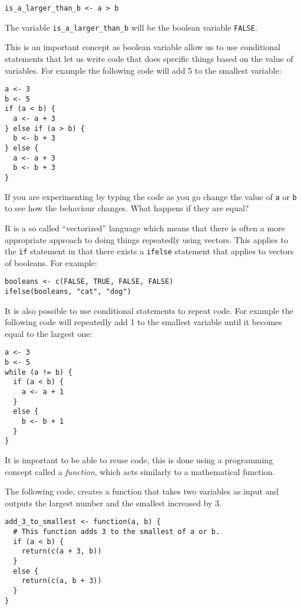 \begin{verbatim}
is_a_larger_than_b <- a > b
\end{verbatim}

The variable \texttt{is_a_larger_than_b} will be the boolean variable
\texttt{FALSE}.

This is an important concept as boolean variable allow us to use conditional
statements that let us write code that does specific things based on the value
of variables. For example the following code will add 5 to the smallest
variable:

\begin{verbatim}
a <- 3
b <- 5
if (a < b) {
  a <- a + 3
} else if (a > b) {
  b <- b + 3
} else {
  a <- a + 3
  b <- b + 3
}
\end{verbatim}

If you are experimenting by typing the code as you go change the value of
\texttt{a} or \texttt{b} to see how the behaviour changes.
What happens if they are equal?

R is a so called ``vectorized'' language which means that there is often a more
appropriate approach to doing things repeatedly using vectors. This applies to
the \texttt{if} statement in that there exists a \texttt{ifelse}
statement that applies to vectors of booleans. For example:

\begin{verbatim}
booleans <- c(FALSE, TRUE, FALSE, FALSE)
ifelse(booleans, "cat", "dog")
\end{verbatim}

It is also possible to use conditional statements to repeat code. For
example the following code will repeatedly add 1 to the smallest variable until
it becomes equal to the largest one:

\begin{verbatim}
a <- 3
b <- 5
while (a != b) {
  if (a < b) {
    a <- a + 1
  }
  else {
    b <- b + 1
  }
}
\end{verbatim}

It is important to be able to reuse code, this is done using a programming
concept called a \textit{function}, which acts similarly to a mathematical
function.

The following code, creates a function that takes two variables as input and
outputs the largest number and the smallest increased by 3.

\begin{verbatim}
add_3_to_smallest <- function(a, b) {
  # This function adds 3 to the smallest of a or b.
  if (a < b) {
    return(c(a + 3, b))
  }
  else {
    return(c(a, b + 3))
  }
}
\end{verbatim}

